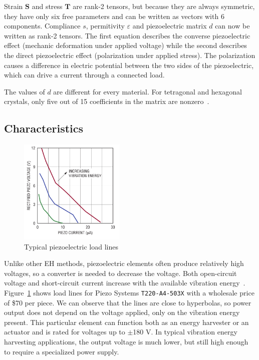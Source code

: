\documentclass[a4paper,10pt]{article}
\renewcommand{\vec}{\mathbf}
\begin{document}
Strain $\vec S$ and stress $\vec T$ are rank-2 tensors, but because they are always symmetric, they have only six free parameters and can be written as vectors with 6 components. Compliance $s$, permitivity $\varepsilon$ and piezoelectric matrix $d$ can now be written as rank-2 tensors. The first equation describes the converse piezoelectric effect (mechanic deformation under applied voltage) while the second describes the direct piezoelectric effect (polarization under applied stress). The polarization causes a difference in electric potential between the two sides of the piezoelectric, which can drive a current through a connected load. 

The values of $d$ are different for every material. For tetragonal and hexagonal crystals, only five out of 15 coefficients in the matrix are nonzero~\cite{wiki:piezo}. 

\subsection{Characteristics}

\begin{figure}[h!]
\centering
  \includegraphics[width=0.45\textwidth]{./Slike/Piezo-UI}
\caption{Typical piezoelectric load lines~\cite{LT-Piezo}}
\label{fig:piezo-load}
\end{figure}

Unlike other \ac{EH} methods, piezoelectric elements often produce relatively high voltages, so a converter is needed to decrease the voltage. Both open-circuit voltage and short-circuit current increase with the available vibration energy~\cite{LT-Piezo}. Figure~\ref{fig:piezo-load} shows load lines for Piezo Systems \texttt{T220-A4-503X} with a wholesale price of \$70 per piece. We can observe that the lines are close to hyperbolas, so power output does not depend on the voltage applied, only on the vibration energy present. This particular element can function both as an energy harvester or an actuator and is rated for voltages up to $\pm$180 V. In typical vibration energy harvesting applications, the output voltage is much lower, but still high enough to require a specialized power supply. 
\end{document}
